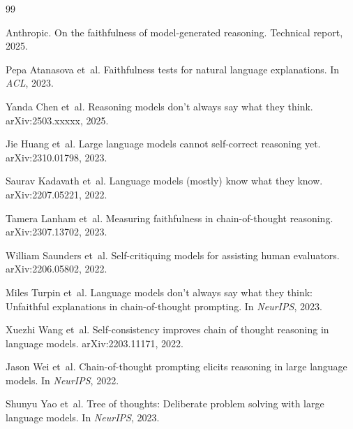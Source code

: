 \documentclass[11pt]{article}
\begin{document}

\begin{thebibliography}{99}

Anthropic.
\newblock On the faithfulness of model-generated reasoning.
\newblock Technical report, 2025.

Pepa Atanasova et~al.
\newblock Faithfulness tests for natural language explanations.
\newblock In \emph{ACL}, 2023.

Yanda Chen et~al.
\newblock Reasoning models don't always say what they think.
\newblock arXiv:2503.xxxxx, 2025.

Jie Huang et~al.
\newblock Large language models cannot self-correct reasoning yet.
\newblock arXiv:2310.01798, 2023.

Saurav Kadavath et~al.
\newblock Language models (mostly) know what they know.
\newblock arXiv:2207.05221, 2022.

Tamera Lanham et~al.
\newblock Measuring faithfulness in chain-of-thought reasoning.
\newblock arXiv:2307.13702, 2023.

William Saunders et~al.
\newblock Self-critiquing models for assisting human evaluators.
\newblock arXiv:2206.05802, 2022.

Miles Turpin et~al.
\newblock Language models don't always say what they think: Unfaithful explanations in chain-of-thought prompting.
\newblock In \emph{NeurIPS}, 2023.

Xuezhi Wang et~al.
\newblock Self-consistency improves chain of thought reasoning in language models.
\newblock arXiv:2203.11171, 2022.

Jason Wei et~al.
\newblock Chain-of-thought prompting elicits reasoning in large language models.
\newblock In \emph{NeurIPS}, 2022.

Shunyu Yao et~al.
\newblock Tree of thoughts: Deliberate problem solving with large language models.
\newblock In \emph{NeurIPS}, 2023.

\end{thebibliography}
\end{document}
